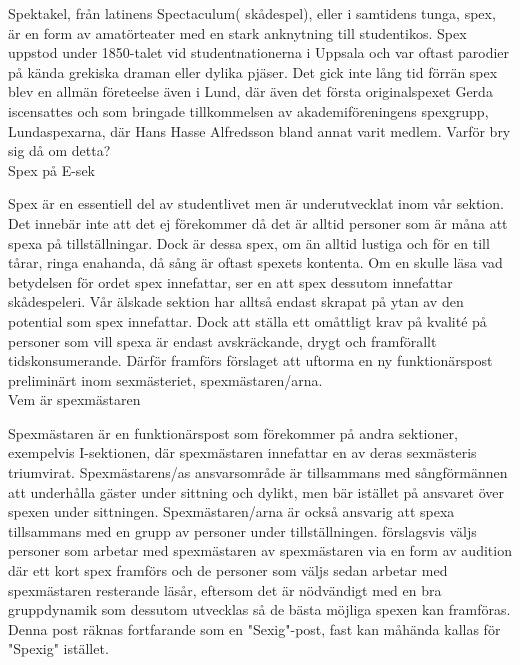 \documentclass[../_main/handlingar.tex]{subfiles}
\begin{document}
Spektakel, från latinens Spectaculum( skådespel), eller i samtidens tunga, spex, är en form av amatörteater med en stark anknytning till studentikos. Spex uppstod under 1850-talet vid studentnationerna i Uppsala och var oftast parodier på kända grekiska draman eller dylika pjäser. Det gick inte lång tid förrän spex blev en allmän företeelse även i Lund, där även det första originalspexet Gerda iscensattes och som bringade tillkommelsen av akademiföreningens spexgrupp, Lundaspexarna, där Hans Hasse Alfredsson bland annat varit medlem. 
Varför bry sig då om detta? 
\\

Spex på E-sek

Spex är en essentiell del av studentlivet men är underutvecklat inom vår sektion. Det innebär inte att det ej förekommer då det är alltid personer som är måna att spexa på tillställningar. Dock är dessa spex, om än alltid lustiga och för en till tårar, ringa enahanda, då sång är oftast spexets kontenta. Om en skulle läsa vad betydelsen för ordet spex innefattar, ser en att spex dessutom innefattar skådespeleri. Vår älskade sektion har alltså endast skrapat på ytan av den potential som spex innefattar. Dock att ställa ett omåttligt krav på kvalité på personer som vill spexa är endast avskräckande, drygt och framförallt tidskonsumerande. Därför framförs förslaget att uftorma en ny funktionärspost preliminärt inom sexmästeriet, spexmästaren/arna.
\\

Vem är spexmästaren

Spexmästaren är en funktionärspost som förekommer på andra sektioner, exempelvis I-sektionen, där spexmästaren innefattar en av deras sexmästeris triumvirat. Spexmästarens/as ansvarsområde är tillsammans med sångförmännen att underhålla gäster under sittning och dylikt, men bär istället på ansvaret över spexen under sittningen. Spexmästaren/arna är också ansvarig att spexa tillsammans med en grupp av personer under tillställningen. förslagsvis väljs personer som arbetar med spexmästaren av spexmästaren via en form av audition där ett kort spex framförs och de personer som väljs sedan arbetar med spexmästaren resterande läsår, eftersom det är nödvändigt med en bra gruppdynamik som dessutom utvecklas så de bästa möjliga spexen kan framföras. Denna post räknas fortfarande som en "Sexig"-post, fast kan måhända kallas för "Spexig" istället. 
\\
\end{document}
